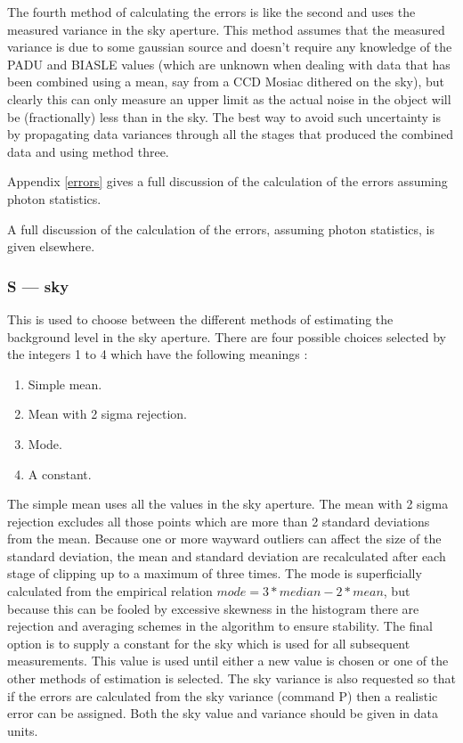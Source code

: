 \documentclass[twoside,11pt]{article}
\newcommand{\htmlref}[2]{#1}
\newenvironment{latexonly}{}{}
\renewcommand{\_}{\texttt{\symbol{95}}}
\begin{document}
The fourth method of calculating the errors is like the second and uses the
measured variance in the sky aperture. This method assumes that the measured
variance is due to some gaussian source and doesn't require any knowledge of
the PADU and BIASLE values (which are unknown when dealing with data that has
been combined using a mean, say from a CCD Mosiac dithered on the sky), but
clearly this can only measure an upper limit as the actual noise in the
object will be (fractionally) less than in the sky. The best way to avoid
such uncertainty is by propagating data variances through all the stages that
produced the combined data and using method three.

\begin{latexonly}
Appendix \ref{errors} gives a full discussion of the calculation of
the errors assuming photon statistics.
\end{latexonly}
\begin{htmlonly}
A full discussion of the calculation of
the errors, assuming photon statistics, is given \htmlref{elsewhere}{errors}.
\end{htmlonly}

\subsubsection{S --- sky}

This is used to choose between the different methods of estimating the
background level in the sky aperture. There are four possible choices
selected by the integers 1 to 4 which have the following meanings :
\begin{enumerate}
\item Simple mean.
\item Mean with 2 sigma rejection.
\item Mode.
\item A constant.
\end{enumerate}
The simple mean uses all the values in the sky aperture. The mean with
2 sigma rejection excludes all those points which are more than 2
standard deviations from the mean. Because one or more wayward
outliers can affect the size of the standard deviation, the mean and
standard deviation are recalculated after each stage of clipping up to
a maximum of three times.  The mode is superficially calculated from
the empirical relation
$mode = 3 * median - 2 * mean$, but because this can be fooled by
excessive skewness in the histogram there are rejection and averaging
schemes in the algorithm to ensure stability. The final option is to
supply a constant for the sky which is used for all
subsequent measurements. This value is used until either a new value is
chosen or one of the other methods of estimation is selected. The sky
variance is also requested so that if the errors are calculated from the
sky variance (command P) then a realistic error can be assigned. Both
the sky value and variance should be given in data units.
\end{document}

